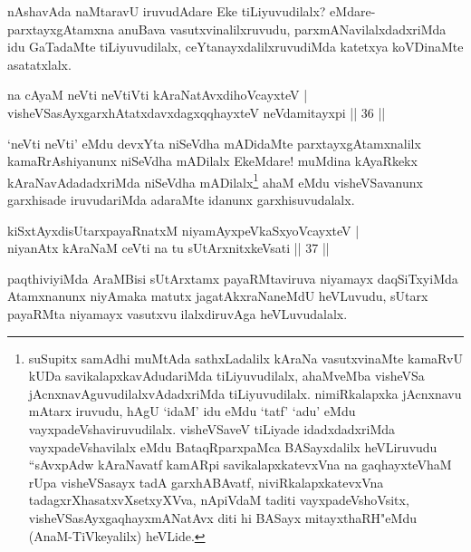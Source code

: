 \begin{artha}
nAshavAda naMtaravU iruvudAdare Eke tiLiyuvudilalx? eMdare- parxtayxgAtamxna anuBava vasutxvinalilxruvudu, parxmANavilalxdadxriMda idu GaTadaMte tiLiyuvudilalx, ceYtanayxdalilxruvudiMda katetxya koVDinaMte asatatxlalx.
\end{artha}


\begin{shl}
na cAyaM neVti neVtiVti kAraNatAvxdihoVcayxteV |\\
visheVSasAyxgarxhAtatxdavxdagxqqhayxteV neVdamitayxpi \hfill || 36 ||
\end{shl}

\begin{artha}
`neVti neVti' eMdu devxYta niSeVdha mADidaMte parxtayxgAtamxnalilx kamaRrAshiyanunx niSeVdha mADilalx EkeMdare! muMdina kAyaRkekx kAraNavAdadadxriMda niSeVdha mADilalx\footnote[1]{suSupitx samAdhi muMtAda sathxLadalilx kAraNa vasutxvinaMte kamaRvU kUDa savikalapxkavAduda\-riMda tiLiyuvudilalx, ahaMveMba visheVSa jAcnxnavAguvudilalxvAdadxriMda tiLiyuvudilalx. nimiRkalapxka jAcnxnavu mAtarx iruvudu, hAgU `idaM' idu eMdu `tatf' `adu' eMdu vayxpadeVshaviruvudilalx. visheVSaveV tiLiyade idadxdadxriMda vayxpadeVshavilalx eMdu BataqRparxpaMca BASayxdalilx heVLiruvudu ``sAvxpAdw kAraNavatf kamARpi savikalapxkatevxVna na gaqhayxteV\s haM rUpa visheVSasayx tadA garxhABAvatf, niviRkalapxkatevxVna tadagxrXhasatxvXsetxyXVva, nApiVdaM taditi vayxpadeVshoV\s sitx, visheVSasAyx\s gaqhayxmANatAvx diti hi BASayx mitayxthaRH"eMdu (AnaM-TiVkeyalilx) heVLide.} ahaM eMdu visheVSavanunx garxhisade iruvudariMda adaraMte idanunx garxhisuvudalalx.
\end{artha}

\begin{shl}
kiSxtAyxdisUtarxpayaRnatxM niyamAyxpeVkaSxyoVcayxteV |\\
niyanAtx kAraNaM ceVti na tu sUtArxnitxkeV\s sati \hfill || 37 ||
\end{shl}

\begin{artha}%
paqthiviyiMda AraMBisi sUtArxtamx payaRMtaviruva niyamayx daqSiTxyiMda Atamxnanunx niyAmaka matutx jagatAkxraNaneMdU heVLuvudu, sUtarx payaRMta niyamayx vasutxvu ilalxdiruvAga heVLuvudalalx.
\end{artha}


